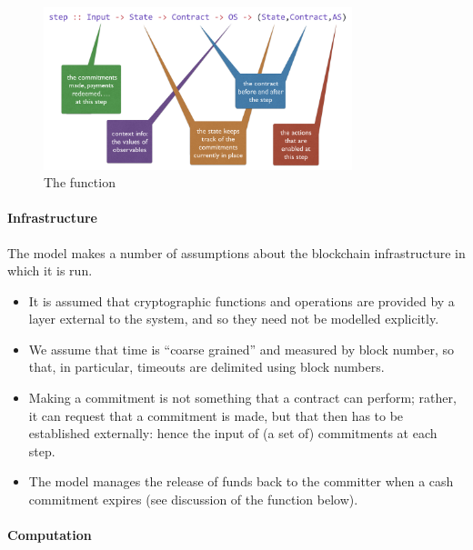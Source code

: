 \documentclass[runningheads]{llncs}
\begin{document}
\begin{figure}[t]
\begin{center}
\includegraphics[width=0.8\textwidth]{pix/step-type.png}
\caption{The  function}
\label{fig:step-function}
\end{center}
\vspace*{-8mm}
\end{figure}

\paragraph{Infrastructure}

The model makes a number of assumptions about the blockchain infrastructure in which it is run.

\begin{itemize}
\item It is assumed that cryptographic functions and operations are provided by a layer external to the system, and so 
they need not be modelled explicitly.
\item We assume that time is ``coarse grained'' and measured by block number, so that, in particular, timeouts are 
delimited using block numbers. 
\item 
Making a commitment is not something that a contract can perform; rather, it 
can request that a commitment is made, but that then has to be established externally: hence the input of (a set of) 
commitments at each step.
\item The model manages the release of funds back to the committer when a cash commitment expires (see discussion of 
the  function below).
\end{itemize}

\paragraph{Computation}
\end{document}
